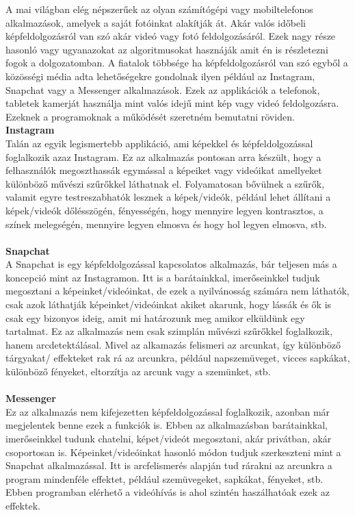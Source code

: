 
A mai világban elég népszerűek az olyan számítógépi vagy mobiltelefonos alkalmazások, amelyek a saját fotóinkat alakítják át. Akár valós időbeli képfeldolgozásról van szó akár videó vagy fotó feldolgozásáról. Ezek nagy része hasonló vagy ugyanazokat az algoritmusokat hasznáják amit én is részletezni fogok a dolgozatomban.
A fiatalok többsége ha képfeldolgozásról van szó egyből a közösségi média adta lehetőségekre gondolnak ilyen például az Instagram, Snapchat vagy a Messenger alkalmazások. Ezek az applikációk a telefonok, tabletek kamerját használja mint valós idejű mint kép vagy videó feldolgozásra. Ezeknek a programoknak a működését szeretném bemutatni röviden.
\textbf{Instagram} 
\\
Talán az egyik legismertebb applikáció, ami képekkel és képfeldolgozással foglalkozik azaz Instagram. Ez az alkalmazás pontosan arra készült, hogy a felhasználók megoszthassák egymással a képeiket vagy videóikat amellyeket különböző művészi szűrőkkel láthatnak el. Folyamatosan bővülnek a szűrők, valamit egyre testreszabhatók lesznek a képek/videók, például lehet állítani a képek/videók dőlésszögén, fényességén, hogy mennyire legyen kontrasztos, a színek melegségén, mennyire legyen elmosva és hogy hol legyen elmosva, stb. 
\\
\\ \textbf{Snapchat} 
\\
A Snapchat is egy képfeldolgozással kapcsolatos alkalmazás, bár teljesen más a koncepció mint az Instagramon. Itt is a barátainkkal, imerőseinkkel tudjuk megosztani a képeinket/videóinkat, de ezek a nyilvánosság számára nem láthatók, csak azok láthatják képeinket/videóinkat akiket akarunk, hogy lássák és ők is csak egy bizonyos ideig, amit mi határozunk meg amikor elküldünk egy tartalmat. Ez az alkalmazás nem csak szimplán művészi szűrőkkel foglalkozik, hanem arcdetektálásal. Mivel az alkamazás felismeri az arcunkat, így különböző tárgyakat/ effekteket rak rá az arcunkra, például napszemüveget, vicces sapkákat,  különböző fényeket, eltorzítja az arcunk vagy a szemünket, stb.
\\
\\ \textbf{Messenger} 
\\
Ez az alkalmazás nem kifejezetten képfeldolgozással foglalkozik, azonban már megjelentek benne ezek a funkciók is. Ebben az alkalmazásban barátainkkal, imerőseinkkel tudunk chatelni, képet/videót megosztani, akár privátban, akár csoportosan is. Képeinket/videóinkat hasonló módon tudjuk szerkeszteni mint a Snapchat alkalmazással. Itt is arcfelismerés alapján tud rárakni az arcunkra a program mindenféle effektet, például szemüvegeket, sapkákat, fényeket, stb. Ebben programban elérhető a videóhívás is ahol szintén haszálhatóak ezek az effektek.
